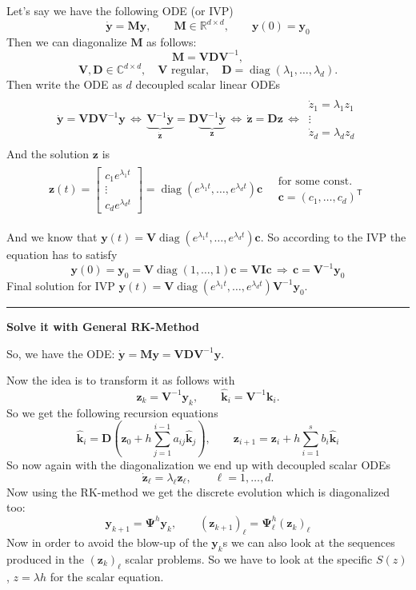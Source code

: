 \documentclass[a4paper,11pt]{extarticle}
\newcommand{\R}{\mathbb{R}}
\newcommand{\C}{\mathbb{C}}
\newcommand*{\T}{\mathsf{T}}
\DeclareMathOperator{\diag}{diag}
\newcommand{\mat}[1]{\mathbf{#1}}
\renewcommand{\vec}[1]{\mathbf{#1}}
\newcommand{\vc}{\vec{c}}
\newcommand{\vk}{\vec{k}}
\newcommand{\vy}{\vec{y}}
\newcommand{\vz}{\vec{z}}
\newcommand{\vhk}{\widehat{\vec{k}}}
\newcommand{\MD}{\mat{D}}
\newcommand{\MI}{\mat{I}}
\newcommand{\MM}{\mat{M}}
\newcommand{\MV}{\mat{V}}
\newcommand{\MPsi}{\mat{\Psi}}
\newcommand{\sep}{\vspace{5pt}\noindent\hrule\vspace{5pt}}
\begin{document}
\begin{multicols*}{2}
Let's say we have the following ODE (or IVP)
\[
\dot{\vy}=\MM\vy,\qquad\MM\in\R^{d\times d}, \qquad
\vy(0)=\vy_0
\]
Then we can diagonalize $\MM$ as follows:
\[
\MM=\MV\MD\MV^{-1},
\]
\[
\MV,\MD\in\C^{d\times d},
\quad
\MV \text{ regular},\quad
\MD =\diag(\lambda_1,\ldots,\lambda_d).
\]
Then write the ODE as $d$ decoupled scalar linear ODEs
\begin{gather*}
\begin{align*}
\dot{\vy}=\MV\MD\MV^{-1}\vy
\,
\Longleftrightarrow
\,
\underbrace{\MV^{-1}\dot{\vy}}_{\dot{\vz}}=\MD\underbrace{\MV^{-1}\dot{\vy}}_{\vz}
\,
\Longleftrightarrow
\,\dot{\vz}=\MD\vz
\,
\Longleftrightarrow
\,
\begin{matrix}
\dot{z}_1 = \lambda_1 z_1\\
\vdots\\
\dot{z}_d = \lambda_d z_d
\end{matrix}
\end{align*}
\end{gather*}
And the solution $\vz$ is
\begin{gather*}
\begin{align*}
\vz(t)=\begin{bmatrix}
c_1e^{\lambda_1 t}\\
\vdots\\
c_de^{\lambda_d t}
\end{bmatrix}
=
\diag(e^{\lambda_1t},\ldots,e^{\lambda_dt})\vc
\quad
\begin{matrix}
\text{for some const. }\\
\vc=(c_1,\ldots,c_d)^\T
\end{matrix}
\end{align*}
\end{gather*}

And we know that
$
\vy(t) = \MV\diag(e^{\lambda_1t},\ldots,e^{\lambda_dt})\vc
$. So according to the IVP the equation has to satisfy
\[
\vy(0)=\vy_0 =\MV\diag(1,\ldots,1)\vc=\MV\MI\vc
\,\Longrightarrow\,
\vc=\MV^{-1}\vy_0
\]
Final solution for IVP $
\vy(t) = \MV\diag(e^{\lambda_1t},\ldots,e^{\lambda_dt})\MV^{-1}\vy_0
$.

\sep

\textbf{Solve it with General RK-Method}

So, we have the ODE:
$
\dot{\vy}=\MM\vy=\MV\MD\MV^{-1}\vy
$.

Now the idea is to transform it as follows with
\[
\vz_k=\MV^{-1}\vy_k, \qquad
\vhk_i=\MV^{-1}\vk_i.
\]
So we get the following recursion equations
\[
\vhk_i=\MD\left(\vz_0+h\sum_{j=1}^{i-1}a_{ij}\vhk_j\right),
\qquad
\vz_{i+1} = \vz_i+h\sum_{i=1}^s b_i\vhk_i
\]
So now again with the diagonalization we end up with decoupled scalar ODEs
\[
\dot{\vz}_\ell = \lambda_\ell\vz_\ell,\qquad \ell=1,\ldots,d.
\]
Now using the RK-method we get the discrete evolution which is diagonalized
too:
\[
\vy_{k+1}=\MPsi^h\vy_k,
\qquad
(\vz_{k+1})_\ell=\MPsi^h_\ell(\vz_k)_\ell 
\]
Now in order to avoid the blow-up of the $\vy_k$s we can also look at the
sequences produced in the $(\vz_k)_\ell$ scalar problems. So we have to look at
the specific $S(z)$, $z=\lambda h$ for the scalar equation.


\end{multicols*}
\end{document}
